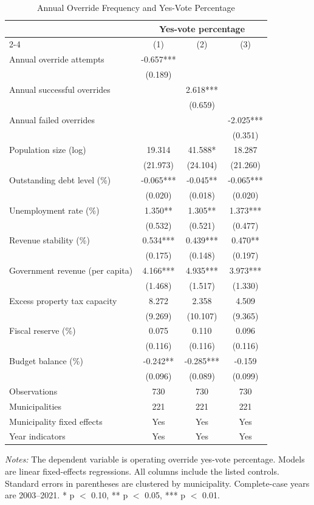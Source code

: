 \begin{table}[!htbp]
\centering
\caption{Annual Override Frequency and Yes-Vote Percentage}
\label{tab:northeast_vote_share_annual}
\small
\begin{tabular}{lccc}
\toprule
 & \multicolumn{3}{c}{Yes-vote percentage} \\
\cmidrule(lr){2-4}
 & (1) & (2) & (3) \\
\midrule
Annual override attempts & -0.657*** &  &  \\
 & (0.189) &  &  \\
Annual successful overrides &  & 2.618*** &  \\
 &  & (0.659) &  \\
Annual failed overrides &  &  & -2.025*** \\
 &  &  & (0.351) \\
Population size (log) & 19.314 & 41.588* & 18.287 \\
 & (21.973) & (24.104) & (21.260) \\
Outstanding debt level (\%) & -0.065*** & -0.045** & -0.065*** \\
 & (0.020) & (0.018) & (0.020) \\
Unemployment rate (\%) & 1.350** & 1.305** & 1.373*** \\
 & (0.532) & (0.521) & (0.477) \\
Revenue stability (\%) & 0.534*** & 0.439*** & 0.470** \\
 & (0.175) & (0.148) & (0.197) \\
Government revenue (per capita) & 4.166*** & 4.935*** & 3.973*** \\
 & (1.468) & (1.517) & (1.330) \\
Excess property tax capacity & 8.272 & 2.358 & 4.509 \\
 & (9.269) & (10.107) & (9.365) \\
Fiscal reserve (\%) & 0.075 & 0.110 & 0.096 \\
 & (0.116) & (0.116) & (0.116) \\
Budget balance (\%) & -0.242** & -0.285*** & -0.159 \\
 & (0.096) & (0.089) & (0.099) \\
\midrule
Observations & 730 & 730 & 730 \\
Municipalities & 221 & 221 & 221 \\
Municipality fixed effects & Yes & Yes & Yes \\
Year indicators & Yes & Yes & Yes \\
\bottomrule
\end{tabular}
\vspace{0.05in}
\begin{minipage}{0.96\textwidth}\footnotesize\emph{Notes:} The dependent variable is operating override yes-vote percentage. Models are linear fixed-effects regressions. All columns include the listed controls. Standard errors in parentheses are clustered by municipality. Complete-case years are 2003--2021. * p $<$ 0.10, ** p $<$ 0.05, *** p $<$ 0.01.\end{minipage}
\end{table}
